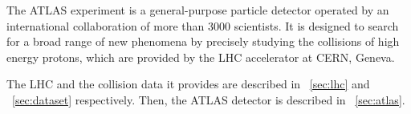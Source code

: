 
The ATLAS experiment is a general-purpose particle detector operated by an international 
collaboration of more than 3000 scientists. It is designed to search for a broad range of 
new phenomena by precisely studying the collisions of high energy protons, which are 
provided by the \ac{LHC} accelerator at CERN, Geneva.

The \ac{LHC} and the \pp collision data it provides are described in \Section~\ref{sec:lhc}
and \Section~\ref{sec:dataset} respectively. Then, the ATLAS detector is described in
\Section~\ref{sec:atlas}.

